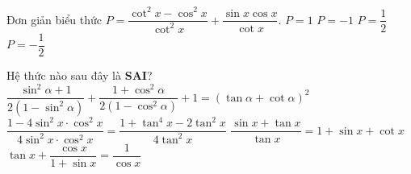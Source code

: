 \begin{ex}%
Đơn giản biểu thức $P=\dfrac{{{\cot}^2x-\cos^2x}}{{{\cot}^2x}}+\dfrac{{\sin x \cos x}}{{\cot x}}.$
\choice
{\True $P=1$}
{$P=-1$}
{$P=\dfrac{1}{2}$}
{$P=-\dfrac{1}{2}$}
\end{ex}

\begin{ex}%
Hệ thức nào sau đây là {\bf SAI}? 
\choice
{$\dfrac{{{\sin}^2\alpha+1}}{{2\left({1-{\sin}^2\alpha}\right)}}+\dfrac{{1+\cos^2\alpha}}{{2\left({1-\cos^2\alpha}\right)}}+1=\left({\tan \alpha+\cot \alpha}\right)^2$}
{$\dfrac{{1-4{\sin}^2x\cdot \cos^2x}}{{4{\sin}^2x\cdot \cos^2x}}=\dfrac{{1+{\tan}^4x-2{\tan}^2x}}{{4{\tan}^2x}}$}
{\True $\dfrac{{\sin x+\tan x}}{{\tan x}}=1+\sin x+\cot x$}
{$\tan x+\dfrac{{\cos x}}{{1+\sin x}}=\dfrac{1}{{\cos x}}$}
\end{ex}
% 
